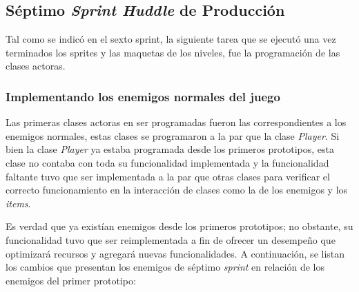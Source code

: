 \subsection{Séptimo \textit{Sprint Huddle} de Producción} 
Tal como se indicó en el sexto sprint, la siguiente tarea que se ejecutó una 
vez terminados los sprites y las maquetas de los niveles, fue la programación de 
las clases actoras. 

\subsubsection{Implementando los enemigos normales del juego} 
Las primeras clases actoras en ser programadas fueron las correspondientes a los 
enemigos normales, estas clases se programaron a la par que la clase \textit{Player}. 
Si bien la clase \textit{Player} ya estaba programada desde los primeros prototipos, 
esta clase no contaba con toda su funcionalidad implementada y la funcionalidad 
faltante tuvo que ser implementada a la par que otras clases para verificar el 
correcto funcionamiento en la interacción de clases como la de los enemigos y los 
\textit{items}.
\\
\par 
Es verdad que ya existían enemigos desde los primeros prototipos; no obstante, 
su funcionalidad tuvo que ser reimplementada a fin de ofrecer un desempeño que 
optimizará recursos y agregará nuevas funcionalidades. A continuación, se listan los 
cambios que presentan los enemigos de séptimo \textit{sprint} en relación de los 
enemigos del primer prototipo: 

